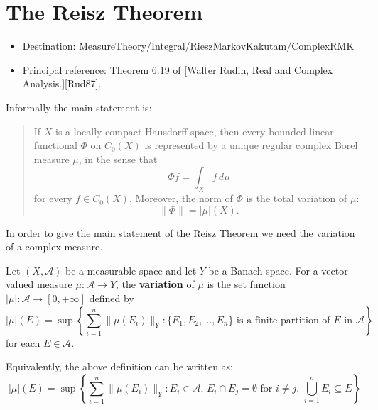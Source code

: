 \chapter{The Reisz Theorem}

\begin{itemize}
  \item Destination: MeasureTheory/Integral/RieszMarkovKakutam/ComplexRMK
  \item Principal reference: Theorem 6.19 of [Walter Rudin, Real and Complex Analysis.][Rud87].
\end{itemize}

Informally the main statement is:
\begin{quotation}
  If $X$ is a locally compact Hausdorff space, then every bounded linear functional $\Phi$ on $C_0(X)$ is represented by a unique regular complex Borel measure $\mu$, in the sense that
  \begin{equation}
    \Phi f = \int_X f \, d\mu
  \end{equation}
  for every $f \in C_0(X)$.
  Moreover, the norm of $\Phi$ is the total variation of $\mu$:
  \begin{equation}
    \|\Phi\| = |\mu|(X).
  \end{equation}
\end{quotation}

In order to give the main statement of the Reisz Theorem we need the variation of a complex measure.

\begin{definition}
  \label{def:variation}
  \leanok
  Let $(X, \mathcal{A})$ be a measurable space and let $Y$ be a Banach space. For a vector-valued measure $\mu: \mathcal{A} \to Y$, the \textbf{variation} of $\mu$ is the set function $|\mu|: \mathcal{A} \to [0, +\infty]$ defined by
  \begin{equation*}
    |\mu|(E) = \sup \left\{ \sum_{i=1}^n \|\mu(E_i)\|_Y : \{E_1, E_2, \ldots, E_n\} \text{ is a finite partition of } E \text{ in } \mathcal{A} \right\}
  \end{equation*}
  for each $E \in \mathcal{A}$.
\end{definition}

Equivalently, the above definition can be written as:
\begin{equation*}
  |\mu|(E) = \sup \left\{ \sum_{i=1}^n \|\mu(E_i)\|_Y : E_i \in \mathcal{A}, \, E_i \cap E_j = \emptyset \text{ for } i \neq j, \, \bigcup_{i=1}^n E_i \subseteq E \right\}
\end{equation*}

